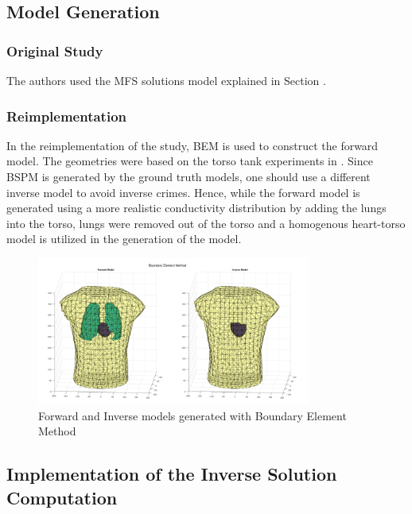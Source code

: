 \documentclass[draftcls, onecolumn, journal]{IEEEtran}
\begin{document}
\subsection{Model Generation} \label{subsec:modelgeneration}

\subsubsection{Original Study}

The authors used the MFS solutions model explained in Section .

\subsubsection{Reimplementation}\label{subsec:modelreimplement}

In the reimplementation of the study, BEM is used to construct the forward model. The geometries were based on the torso tank experiments in \cite{macleod1995electrocardiographic}. Since BSPM is generated by the ground truth models, one should use a different inverse model to avoid inverse crimes. Hence, while the forward model is generated using a more realistic conductivity distribution by adding the lungs into the torso, lungs were removed out of the torso and a homogenous heart-torso model is utilized in the generation of the model. 

\begin{figure}[h!]
    \centering
    \includegraphics[width=0.8\textwidth]{../images/BEM.png}
    \caption{Forward and Inverse models generated with Boundary Element Method}\label{fig:mylabel}
\end{figure}
    
\newpage

\subsection{Implementation of the Inverse Solution Computation}
\end{document}

